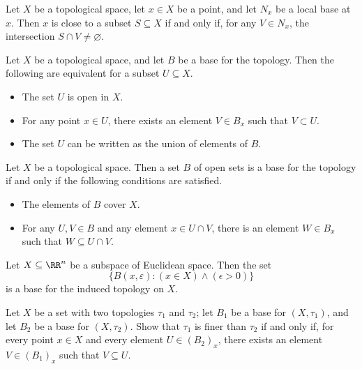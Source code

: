 \begin{prp}
	Let $X$ be a topological space, let $x\in X$ be a point, and let $N_x$ be a local base at $x$.
	Then $x$ is close to a subset $S\subseteq X$ if and only if, for any $V\in N_x$, the intersection $S\cap V\neq\varnothing$.
\end{prp}

\begin{prp}\label{thm:baseopens}
	Let $X$ be a topological space, and let $B$ be a base for the topology.
	Then the following are equivalent for a subset $U\subseteq X$.
	\begin{itemize}
		\item The set $U$ is open in $X$.
		\item For any point $x\in U$, there exists an element $V\in B_x$ such that $V\subset U$.
		\item The set $U$ can be written as the union of elements of $B$.
	\end{itemize}
\end{prp}

\begin{prp}\label{prp:basesrecog}
	Let $X$ be a topological space.
	Then a set $B$ of open sets is a base for the topology if and only if the following conditions are satisfied.
	\begin{itemize}
		\item The elements of $B$ cover $X$.
		\item For any $U,V\in B$ and any element $x\in U\cap V$, there is an element $W\in B_x$ such that $W\subseteq U\cap V$.
	\end{itemize}
\end{prp}

\begin{exm}
	Let $X \subseteq \RR^n$ be a subspace of Euclidean space.
	Then the set
	\begin{equation*}
		\{ B(x,\varepsilon) : (x\in X) \wedge (\epsilon>0) \}
	\end{equation*}
	is a base for the induced topology on $X$.
\end{exm}

\begin{exm}
	Let $X$ be a set with two topologies $\tau_1$ and $\tau_2$;
	let $B_1$ be a base for $(X,\tau_1)$, and let $B_2$ be a base for $(X,\tau_2)$.
	Show that $\tau_1$ is finer than $\tau_2$ if and only if, for every point $x\in X$ and every element $U\in(B_2)_x$, there exists an element $V\in(B_1)_x$ such that $V\subseteq U$.
\end{exm}


